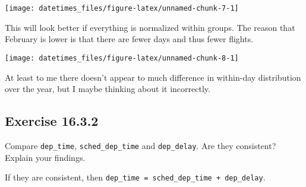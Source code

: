 \documentclass[]{book}
\newenvironment{Shaded}{\begin{snugshade}}{\end{snugshade}}
\newcommand{\DataTypeTok}[1]{\textcolor[rgb]{0.13,0.29,0.53}{#1}}
\newcommand{\DecValTok}[1]{\textcolor[rgb]{0.00,0.00,0.81}{#1}}
\newcommand{\KeywordTok}[1]{\textcolor[rgb]{0.13,0.29,0.53}{\textbf{#1}}}
\newcommand{\NormalTok}[1]{#1}
\newcommand{\OperatorTok}[1]{\textcolor[rgb]{0.81,0.36,0.00}{\textbf{#1}}}
\newcommand{\StringTok}[1]{\textcolor[rgb]{0.31,0.60,0.02}{#1}}
\theoremstyle{plain}
\theoremstyle{remark}
\theoremstyle{definition}
\theoremstyle{definition}
\theoremstyle{definition}
\theoremstyle{remark}
\begin{document}
\begin{center}\texttt{[image: datetimes\_files/figure-latex/unnamed-chunk-7-1]} \end{center}

This will look better if everything is normalized within groups. The
reason that February is lower is that there are fewer days and thus
fewer flights.

\begin{Shaded}
\end{Shaded}

\begin{center}\texttt{[image: datetimes\_files/figure-latex/unnamed-chunk-8-1]} \end{center}

At least to me there doesn't appear to much difference in within-day
distribution over the year, but I maybe thinking about it incorrectly.

\hypertarget{exercise-16.3.2}{%
\subsection*{\texorpdfstring{Exercise
{16.3.2}}{Exercise 16.3.2}}\label{exercise-16.3.2}}

Compare \texttt{dep\_time}, \texttt{sched\_dep\_time} and
\texttt{dep\_delay}. Are they consistent? Explain your findings.

If they are consistent, then
\texttt{dep\_time\ =\ sched\_dep\_time\ +\ dep\_delay}.
\end{document}
